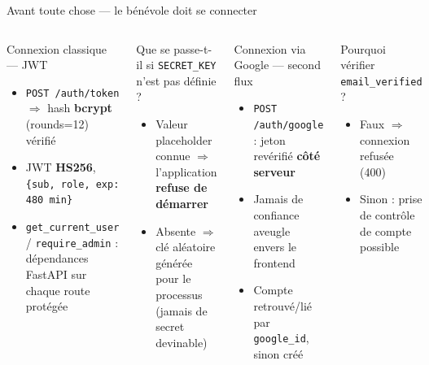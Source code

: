 \documentclass[aspectratio=169,10pt]{beamer}
\begin{document}
\begin{frame}{Avant toute chose --- le bénévole doit se connecter}
  \begin{columns}[T]
    \begin{block}{Connexion classique --- JWT}
      \begin{itemize}\small
        \item \texttt{POST /auth/token} $\Rightarrow$ hash \textbf{bcrypt} (rounds=12) vérifié
        \item JWT \textbf{HS256}, \texttt{\{sub, role, exp: 480 min\}}
        \item \texttt{get\_current\_user} / \texttt{require\_admin} : dépendances FastAPI sur chaque route protégée
      \end{itemize}
    \end{block}
    \vspace{4pt}
    \begin{alertblock}{\small Que se passe-t-il si \texttt{SECRET\_KEY} n'est pas définie ?}
      \begin{itemize}\small
        \item Valeur \og placeholder \fg{} connue $\Rightarrow$ l'application \textbf{refuse de démarrer}
        \item Absente $\Rightarrow$ clé aléatoire générée pour le processus (jamais de secret devinable)
      \end{itemize}
    \end{alertblock}
    \begin{block}{Connexion via Google --- second flux}
      \begin{itemize}\small
        \item \texttt{POST /auth/google} : jeton revérifié \textbf{côté serveur}
        \item Jamais de confiance aveugle envers le frontend
        \item Compte retrouvé/lié par \texttt{google\_id}, sinon créé
      \end{itemize}
    \end{block}
    \vspace{4pt}
    \begin{alertblock}{\small Pourquoi vérifier \texttt{email\_verified} ?}
      \begin{itemize}\small
        \item Faux $\Rightarrow$ connexion refusée (400)
        \item Sinon : prise de contrôle de compte possible
      \end{itemize}
    \end{alertblock}
  \end{columns}
\end{frame}
\end{document}
